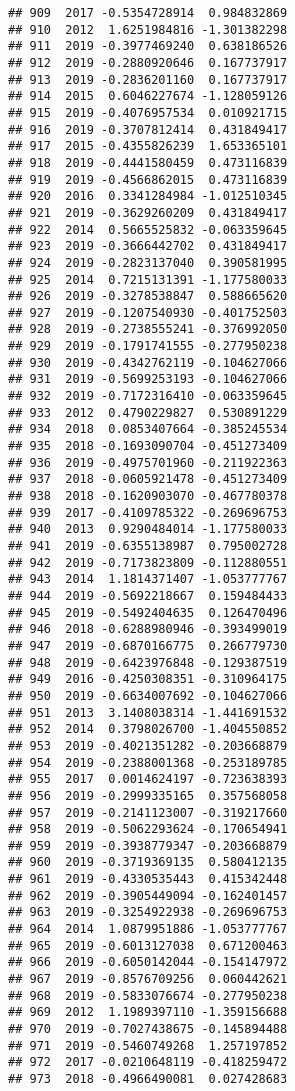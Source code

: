 \documentclass[
]{article}
\begin{document}
\begin{verbatim}
## 909  2017 -0.5354728914  0.984832869
## 910  2012  1.6251984816 -1.301382298
## 911  2019 -0.3977469240  0.638186526
## 912  2019 -0.2880920646  0.167737917
## 913  2019 -0.2836201160  0.167737917
## 914  2015  0.6046227674 -1.128059126
## 915  2019 -0.4076957534  0.010921715
## 916  2019 -0.3707812414  0.431849417
## 917  2015 -0.4355826239  1.653365101
## 918  2019 -0.4441580459  0.473116839
## 919  2019 -0.4566862015  0.473116839
## 920  2016  0.3341284984 -1.012510345
## 921  2019 -0.3629260209  0.431849417
## 922  2014  0.5665525832 -0.063359645
## 923  2019 -0.3666442702  0.431849417
## 924  2019 -0.2823137040  0.390581995
## 925  2014  0.7215131391 -1.177580033
## 926  2019 -0.3278538847  0.588665620
## 927  2019 -0.1207540930 -0.401752503
## 928  2019 -0.2738555241 -0.376992050
## 929  2019 -0.1791741555 -0.277950238
## 930  2019 -0.4342762119 -0.104627066
## 931  2019 -0.5699253193 -0.104627066
## 932  2019 -0.7172316410 -0.063359645
## 933  2012  0.4790229827  0.530891229
## 934  2018  0.0853407664 -0.385245534
## 935  2018 -0.1693090704 -0.451273409
## 936  2019 -0.4975701960 -0.211922363
## 937  2018 -0.0605921478 -0.451273409
## 938  2018 -0.1620903070 -0.467780378
## 939  2017 -0.4109785322 -0.269696753
## 940  2013  0.9290484014 -1.177580033
## 941  2019 -0.6355138987  0.795002728
## 942  2019 -0.7173823809 -0.112880551
## 943  2014  1.1814371407 -1.053777767
## 944  2019 -0.5692218667  0.159484433
## 945  2019 -0.5492404635  0.126470496
## 946  2018 -0.6288980946 -0.393499019
## 947  2019 -0.6870166775  0.266779730
## 948  2019 -0.6423976848 -0.129387519
## 949  2016 -0.4250308351 -0.310964175
## 950  2019 -0.6634007692 -0.104627066
## 951  2013  3.1408038314 -1.441691532
## 952  2014  0.3798026700 -1.404550852
## 953  2019 -0.4021351282 -0.203668879
## 954  2019 -0.2388001368 -0.253189785
## 955  2017  0.0014624197 -0.723638393
## 956  2019 -0.2999335165  0.357568058
## 957  2019 -0.2141123007 -0.319217660
## 958  2019 -0.5062293624 -0.170654941
## 959  2019 -0.3938779347 -0.203668879
## 960  2019 -0.3719369135  0.580412135
## 961  2019 -0.4330535443  0.415342448
## 962  2019 -0.3905449094 -0.162401457
## 963  2019 -0.3254922938 -0.269696753
## 964  2014  1.0879951886 -1.053777767
## 965  2019 -0.6013127038  0.671200463
## 966  2019 -0.6050142044 -0.154147972
## 967  2019 -0.8576709256  0.060442621
## 968  2019 -0.5833076674 -0.277950238
## 969  2012  1.1989397110 -1.359156688
## 970  2019 -0.7027438675 -0.145894488
## 971  2019 -0.5460749268  1.257197852
## 972  2017 -0.0210648119 -0.418259472
## 973  2018 -0.4966490081  0.027428683

\end{verbatim}
\end{document}
